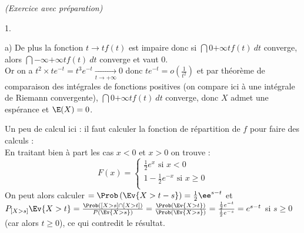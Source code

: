 \documentclass[11pt]{article}%
\begin{document}
\begin{exercice}{\it (Exercice avec préparation)}
\begin{noliste}{1.}
\begin{noliste}{a)}
      De plus la fonction $t \rightarrow t f(t)$ est impaire donc si
      $\dint{0}{+ \infty} t f(t)\ dt$ converge, alors
      $\dint{-\infty}{+ \infty} t f(t)\ dt$ converge et vaut 0. \\
      Or on a $ t^{2} \times t e^{-t} = t^{3} e^{-t} \xrightarrow[t
      \rightarrow + \infty]{} 0$ donc $ t e^{-t} = o \left(
        \frac{1}{t^{2}} \right)$ et par théorème de comparaison des
      intégrales de fonctions positives (on compare ici à une
      intégrale de Riemann convergente), $\dint{0}{+ \infty} t f(t)\
      dt$ converge, donc $X$ admet une espérance et $\E(X) = 0$.
    \item Un peu de calcul ici : il faut calculer la fonction de
      répartition de $f$ pour faire des calculs : \\
      En traitant bien à part les cas $x < 0$ et $x >0$ on trouve :
      \[
      F(x) = \left\{
        \begin{array}{cl}
          \frac{1}{2} e^{x} \text{ si } x <0 \\
          1 - \frac{1}{2} e^{-x} \text{ si } x \geq 0 \\
        \end{array}
      \right.
      \]
      On peut alors calculer $ = \Prob\left(\Ev{X > t - s} \right) =
      \frac{1}{2} \ee^{s - t}$ et $P_{[X > s]} \Ev{X > t} = \frac{
        \Prob( [X > s] \cap [X > t] )}{P \left(\Ev{X > s}\right)} =
      \frac{\Prob\left(\Ev{X > t} \right) }{\Prob\left( \Ev{ X > s}
        \right)} = \frac{ \frac{1}{2} e^{-t} }{ \frac{1}{2} e^{ -s} }
      = e^{s-t} $ si $s \geq 0$ (car alors $t \geq 0$), ce qui
      contredit le résultat.
    \end{noliste}


\end{noliste}
\end{exercice}
\end{document}

